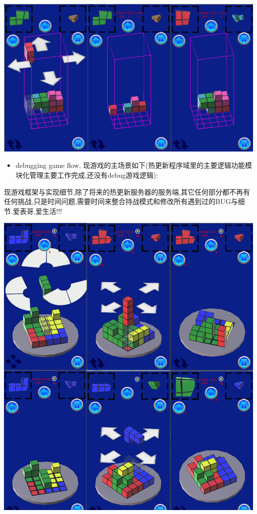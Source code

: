 \documentclass[9pt, b5paper]{article}
\begin{document}
\includegraphics[width=.9\linewidth]{./pic/readme_20221112_072532.png}

\begin{itemize}
\item debugging game flow, 现游戏的主场景如下(热更新程序域里的主要逻辑功能模块化管理主要工作完成,还没有debug游戏逻辑):
\end{itemize}
现游戏框架与实现细节,除了将来的热更新服务器的服务端,其它任何部分都不再有任何挑战,只是时间问题,需要时间来整合持战模式和修改所有遇到过的BUG与细节.爱表哥,爱生活!!!

\includegraphics[width=.9\linewidth]{./pic/readme_20221111_222732.png}
\end{document}
